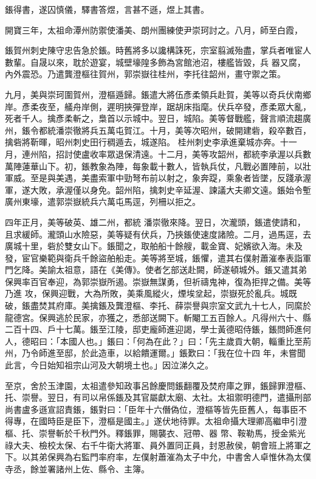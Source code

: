 \begin{pinyinscope}
 鋹得書，遂囚慎儀，驛書答煜，言甚不遜，煜上其書。



 開寶三年，太祖命潭州防禦使潘美、朗州團練使尹崇珂討之。八月，師至白霞，



 鋹賀州刺史陳守忠告急於鋹。時舊將多以讒構誅死，宗室翦滅殆盡，掌兵者唯宦人數輩。自晟以來，耽於遊宴，城壁壕隍多飾為宮館池沼，樓艦皆毀，兵
 器又腐，內外震恐。乃遣龔澄樞往賀州，郭崇嶽往桂州，李托往韶州，畫守禦之策。



 九月，美與崇珂圍賀州，澄樞遁歸。鋹遣大將伍彥柔領兵赴賀，美等以奇兵伏南鄉岸。彥柔夜至，艤舟岸側，遲明挾彈登岸，踞胡床指麾。伏兵卒發，彥柔眾大亂，死者千人。擒彥柔斬之，梟首以示城中。翌日，城陷。美等督戰艦，聲言順流趨廣州，鋹令都統潘崇徹將兵五萬屯賀江。十月，美等次昭州，破開建砦，殺卒數百，擒砦將靳暉，昭州刺史田行稠遁去，城遂陷。
 桂州刺史李承進棄城亦奔。十一月，連州陷，招討使盧收率眾退保清遠。十二月，美等攻韶州，都統李承渥以兵數萬陣蓮華山下。初，鋹教象為陣，每象載十數人，皆執兵仗，凡戰必置陣前，以壯軍威。至是與美遇，美盡索軍中勁弩布前以射之，象奔踶，乘象者皆墜，反踐承渥軍，遂大敗，承渥僅以身免。韶州陷，擒刺史辛延渥、諫議大夫卿文遠。鋹始令塹廣州東壕，遣郭崇嶽統兵六萬屯馬逕，列柵以拒之。



 四年正月，美等破英、雄二州，都統
 潘崇徹來降。翌日，次瀧頭，鋹遣使請和，且求緩師。瀧頭山水險惡，美等疑有伏兵，乃挾鋹使速度諸險。二月，過馬逕，去廣城十里，砦於雙女山下。鋹聞之，取舶船十餘艘，載金寶、妃嬪欲入海。未及發，宦官樂範與衛兵千餘盜舶船走。美等將至城，鋹懼，遣其右僕射蕭漼奉表詣軍門乞降。美諭太祖意，語在《美傳》。使者乞部送赴闕，師遂頓城外。鋹又遣其弟保興率百官奉迎，為郭崇嶽所遏。崇嶽無謀勇，但祈禱鬼神，復為拒捍之備。美等乃進
 攻，保興迎戰，大為所敗，美乘風縱火，煙埃坌起，崇嶽死於亂兵。城既破，鋹盡焚其府庫。美擒鋹及龔澄樞、李托、薛崇譽與宗室文武九十七人，同縻於龍德宮。保興逃於民家，亦獲之，悉部送闕下。斬閹工五百餘人。凡得州六十、縣二百十四、戶十七萬。鋹至江陵，邸吏龐師進迎謁，學士黃德昭侍鋹，鋹問師進何人，德昭曰：「本國人也。」鋹曰：「何為在此？」曰：「先主歲貢大朝，輜重比至荊州，乃令師進至邸，於此造車，以給饋運爾。」鋹歎曰：「我在位十四
 年，未嘗聞此言，今日始知祖宗山河及大朝境土也。」因泣涕久之。



 至京，舍於玉津園，太祖遣參知政事呂餘慶問鋹翻覆及焚府庫之罪，鋹歸罪澄樞、托、崇譽。翌日，有司以帛係鋹及其官屬獻太廟、太社。太祖禦明德門，遣攝刑部尚書盧多遜宣詔責鋹，鋹對曰：「臣年十六僭偽位，澄樞等皆先臣舊人，每事臣不得專，在國時臣是臣下，澄樞是國主。」遂伏地待罪。太祖命攝大理卿高繼申引澄樞、托、崇譽斬於千秋門外。釋鋹罪，賜襲衣、冠帶、器
 幣、鞍勒馬，授金紫光祿大夫、檢校太保、右千牛衛大將軍、員外置同正員，封恩赦侯，朝會班上將軍之下。以其弟保興為右監門率府率，左僕射蕭漼為太子中允，中書舍人卓惟休為太僕寺丞，餘並署諸州上佐、縣令、主簿。




\end{pinyinscope}
